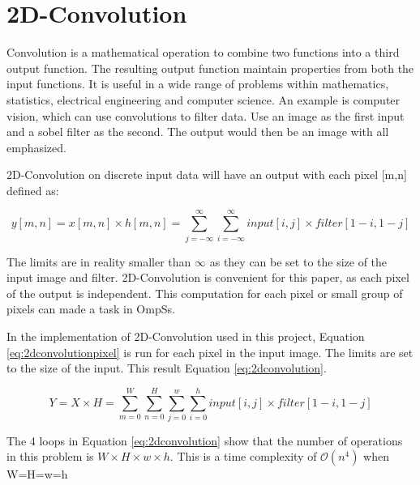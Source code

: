 \section{2D-Convolution}
Convolution is a mathematical operation to combine two functions into a third output function.
The resulting output function maintain properties from both the input functions.
It is useful in a wide range of problems within mathematics, statistics, electrical engineering and computer science.
An example is computer vision, which can use convolutions to filter data.
Use an image as the first input and a sobel filter as the second.
The output would then be an image with all emphasized.

2D-Convolution on discrete input data will have an output with each pixel [m,n] defined as:

\begin{equation} \label{eq:2dconvolutionpixel}
  y[m,n] = x[m,n] \times h[m,n] = \sum\limits_{j=-\infty}^\infty \sum\limits_{i=-\infty}^\infty input[i,j] \times filter[1-i, 1-j]
\end{equation}

The limits are in reality smaller than $\infty$ as they can be set to the size of the input image and filter.
2D-Convolution is convenient for this paper, as each pixel of the output is independent.
This computation for each pixel or small group of pixels can made a task in OmpSs.

In the implementation of 2D-Convolution used in this project, Equation \ref{eq:2dconvolutionpixel} is run for each pixel in the input image.
The limits are set to the size of the input.
This result Equation \ref{eq:2dconvolution}.

\begin{equation} \label{eq:2dconvolution}
  Y = X \times H = \sum\limits_{m=0}^W \sum\limits_{n=0}^H \sum\limits_{j=0}^{w} \sum\limits_{i=0}^{h} input[i,j] \times filter[1-i, 1-j]
\end{equation}

The 4 loops in Equation \ref{eq:2dconvolution} show that the number of operations in this problem is $W\times H\times w\times h$.
This is a time complexity of $\mathcal{O}(n^4)$ when W=H=w=h%

